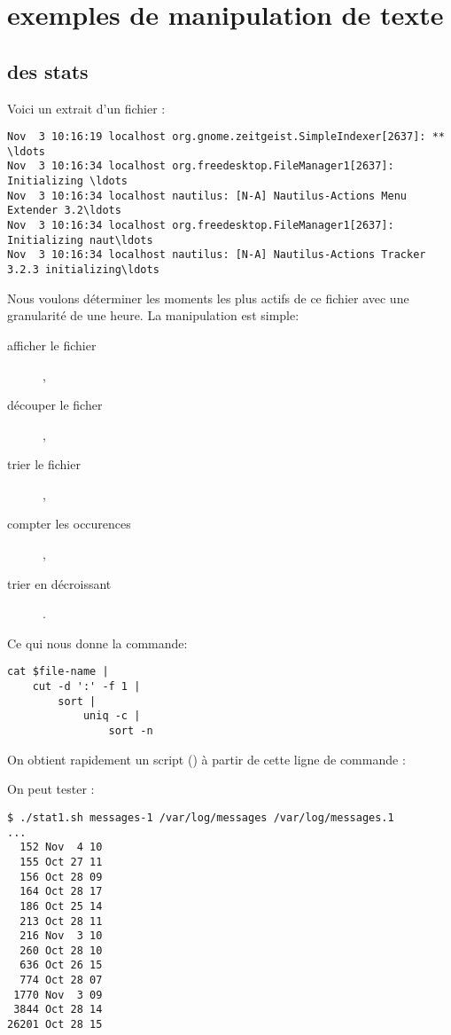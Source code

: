 
\section{exemples de manipulation de texte}

\subsection{des stats}
Voici un extrait d'un fichier :

\begin{lstlisting}
Nov  3 10:16:19 localhost org.gnome.zeitgeist.SimpleIndexer[2637]: ** \ldots
Nov  3 10:16:34 localhost org.freedesktop.FileManager1[2637]: Initializing \ldots
Nov  3 10:16:34 localhost nautilus: [N-A] Nautilus-Actions Menu Extender 3.2\ldots
Nov  3 10:16:34 localhost org.freedesktop.FileManager1[2637]: Initializing naut\ldots
Nov  3 10:16:34 localhost nautilus: [N-A] Nautilus-Actions Tracker 3.2.3 initializing\ldots
\end{lstlisting}

Nous voulons déterminer les moments les plus actifs de ce fichier avec une granularité de une heure.
La manipulation est simple:

\begin{description}
    \item[afficher le fichier] ,
    \item[découper le ficher] ,
    \item[trier le fichier] ,
    \item[compter les occurences] ,
    \item[trier en décroissant] .
\end{description}

Ce qui nous donne la commande:

\begin{lstlisting}
cat $file-name |
    cut -d ':' -f 1 |
        sort |
            uniq -c |
                sort -n
\end{lstlisting}

On obtient rapidement un script () à partir de cette ligne de commande :



On peut tester :

\begin{lstlisting}
$ ./stat1.sh messages-1 /var/log/messages /var/log/messages.1
...
  152 Nov  4 10
  155 Oct 27 11
  156 Oct 28 09
  164 Oct 28 17
  186 Oct 25 14
  213 Oct 28 11
  216 Nov  3 10
  260 Oct 28 10
  636 Oct 26 15
  774 Oct 28 07
 1770 Nov  3 09
 3844 Oct 28 14
26201 Oct 28 15
\end{lstlisting}

